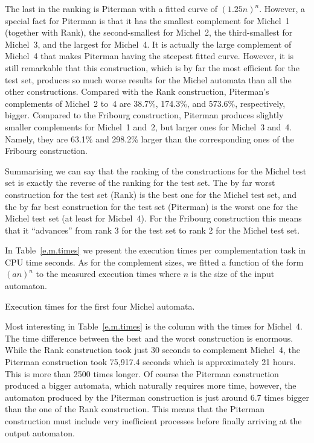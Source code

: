 The last in the ranking is Piterman with a fitted curve of $(1.25n)^n$. However, a special fact for Piterman is that it has the smallest complement for Michel~1 (together with Rank), the second-smallest for Michel~2, the third-smallest for Michel~3, and the largest for Michel~4. It is actually the large complement of Michel~4 that makes Piterman having the steepest fitted curve. However, it is still remarkable that this construction, which is by far the most efficient for the \goal{} test set, produces so much worse results for the Michel automata than all the other constructions. Compared with the Rank construction, Piterman's complements of Michel~2 to~4 are 38.7\%, 174.3\%, and 573.6\%, respectively, bigger. Compared to the Fribourg construction, Piterman produces slightly smaller complements for Michel~1 and~2, but larger ones for Michel~3 and~4. Namely, they are 63.1\% and 298.2\% larger than the corresponding ones of the Fribourg construction.

Summarising we can say that the ranking of the constructions for the Michel test set is exactly the reverse of the ranking for the \goal{} test set. The by far worst construction for the \goal{} test set (Rank) is the best one for the Michel test set, and the by far best construction for the \goal{} test set (Piterman) is the worst one for the Michel test set (at least for Michel~4). For the Fribourg construction this means that it ``advances'' from rank 3 for the \goal{} test set to rank 2 for the Michel test set.

In Table~\ref{e.m.times} we present the execution times per complementation task in CPU time seconds. As for the complement sizes, we fitted a function of the form $(an)^n$ to the measured execution times where $n$ is the size of the input automaton.

\begin{table}[ht]
\centering

\caption{Execution times for the first four Michel automata.}
\label{e.m.times}
\end{table}

Most interesting in Table~\ref{e.m.times} is the column with the times for Michel~4. The time difference between the best and the worst construction is enormous. While the Rank construction took just 30 seconds to complement Michel~4, the Piterman construction took 75,917.4 seconds which is approximately 21 hours. This is more than 2500 times longer. Of course the Piterman construction produced a bigger automata, which naturally requires more time, however, the automaton produced by the Piterman construction is just around 6.7 times bigger than the one of the Rank construction. This means that the Piterman construction must include very inefficient processes before finally arriving at the output automaton.

